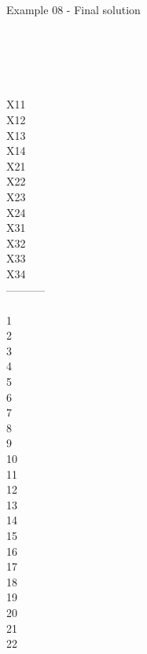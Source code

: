 \begin{frame}{Example 08 - Final solution}

 \\
  \\

\begin{columns}[t]
\begin{column}{0.3\textwidth}
\\
X11\\
X12\\
X13\\
X14\\
X21\\
X22\\
X23\\
X24\\
X31\\
X32\\
X33\\
X34\\
-----------\\
\\
1\\
2\\
3\\
4\\
5\\
6\\
7\\
8\\
9\\
10\\
11\\
12\\
13\\
14\\
15\\
16\\
17\\
18\\
19\\
20\\
21\\
22\\


\end{column}
\end{columns}
\end{frame}
